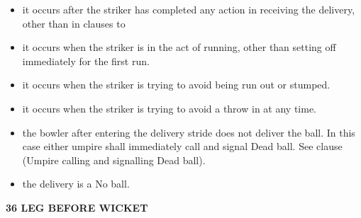 \documentclass[12pt]{article}
\begin{document}
\vspace{\baselineskip}
\begin{itemize}
	\item {\fontsize{9pt}{10.8pt}\selectfont it occurs after the striker has completed any action in receiving the delivery, other than in clauses to \par}\par


\vspace{\baselineskip}
	\item {\fontsize{9pt}{10.8pt}\selectfont it occurs when the striker is in the act of running, other than setting off immediately for the first run.\par}\par


\vspace{\baselineskip}
	\item {\fontsize{9pt}{10.8pt}\selectfont it occurs when the striker is trying to avoid being run out or stumped.\par}\par


\vspace{\baselineskip}
	\item {\fontsize{9pt}{10.8pt}\selectfont it occurs when the striker is trying to avoid a throw in at any time.\par}\par


\vspace{\baselineskip}
	\item {\fontsize{9pt}{10.8pt}\selectfont the bowler after entering the delivery stride does not deliver the ball. In this case either umpire shall immediately call and signal Dead ball. See clause (Umpire calling and signalling Dead ball).\par}\par


\vspace{\baselineskip}
	\item {\fontsize{9pt}{10.8pt}\selectfont the delivery is a No ball.\par}
\end{itemize}\par


\vspace{\baselineskip}
{\fontsize{16pt}{19.2pt}\selectfont \textbf{36 LEG BEFORE WICKET}\par}\par
\end{document}
